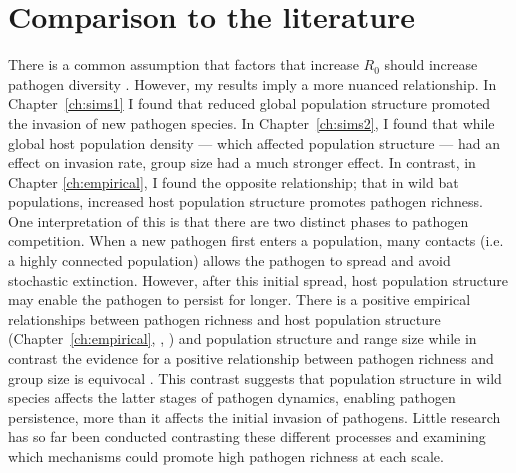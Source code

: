 \section{Comparison to the literature}

There is a common assumption that factors that increase $R_0$ should increase pathogen diversity \cite{nunn2003comparative, morand2000wormy}.
However, my results imply a more nuanced relationship. 
In Chapter~\ref{ch:sims1} I found that reduced global population structure promoted the invasion of new pathogen species.
In Chapter~\ref{ch:sims2}, I found that while global host population density --- which affected population structure --- had an effect on invasion rate, group size had a much stronger effect.
In contrast, in Chapter \ref{ch:empirical}, I found the opposite relationship; that in wild bat populations, increased host population structure promotes pathogen richness.
One interpretation of this is that there are two distinct phases to pathogen competition.
When a new pathogen first enters a population, many contacts (i.e. a highly connected population) allows the pathogen to spread and avoid stochastic extinction.
However, after this initial spread, host population structure may enable the pathogen to persist for longer.
There is a positive empirical relationships between pathogen richness and host population structure (Chapter~\ref{ch:empirical}, \textcite{turmelle2009correlates}, \textcite{maganga2014bat}) and population structure and range size \cite{kamiya2014determines, nunn2003comparative} while in contrast the evidence for a positive relationship between pathogen richness and  group size is equivocal \cite{rifkin2012animals, ezenwa2006host}.
This contrast suggests that population structure in wild species affects the latter stages of pathogen dynamics, enabling pathogen persistence, more than it affects the initial invasion of pathogens.
Little research has so far been conducted contrasting these different processes and examining which mechanisms could promote high pathogen richness at each scale.






